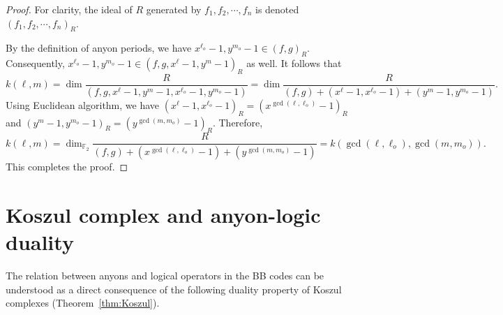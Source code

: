 \documentclass[aps,prl,english,superscriptaddress,twocolumn,tightenlines,showpacs,longbibliography,floatfix,amsfonts]{revtex4-2}
\begin{document}
\begin{proof}
	For clarity, the ideal of $R$ generated by $f_{1},f_{2},\cdots,f_{n}$
	is denoted $\left(f_{1},f_{2},\cdots,f_{n}\right)_{R}$. 
	
	By the definition of anyon periods, we have $x^{\ell_{o}}-1,y^{m_{o}}-1\in\left(f,g\right)_{R}$.
	Consequently, $x^{\ell_{o}}-1,y^{m_{o}}-1\in(f,g,x^{\ell}-1,y^{m}-1)_{R}$
	as well. It follows that
	\begin{equation}
		k\left(\ell,m\right)=\dim\frac{R}{\left(f,g,x^{\ell}-1,y^{m}-1,x^{\ell_{o}}-1,y^{m_{o}}-1\right)}=\dim\frac{R}{\left(f,g\right)+\left(x^{\ell}-1,x^{\ell_{o}}-1\right)+\left(y^{m}-1,y^{m_{o}}-1\right)}.
	\end{equation}
	Using Euclidean algorithm, we have $(x^{\ell}-1,x^{\ell_{o}}-1)_{R}=(x^{\gcd\left(\ell,\ell_{o}\right)}-1)_{R}$
	and $(y^{m}-1,y^{m_{o}}-1)_{R}=(y^{\gcd(m,m_{o})}-1)_{R}$. Therefore,
	\begin{equation}
		k\left(\ell,m\right)=\dim_{\mathbb{F}_{2}}\frac{R}{\left(f,g\right)+(x^{\gcd\left(\ell,\ell_{o}\right)}-1)+(y^{\gcd(m,m_{o})}-1)}=k\left(\gcd\left(\ell,\ell_{o}\right),\gcd\left(m,m_{o}\right)\right).
	\end{equation}
	This completes the proof.
\end{proof}

\section{Koszul complex and anyon-logic duality}

The relation between anyons and logical operators in the BB codes
can be understood as a direct consequence of the following duality
property of Koszul complexes (Theorem~\ref{thm:Koszul}). 
\end{document}
